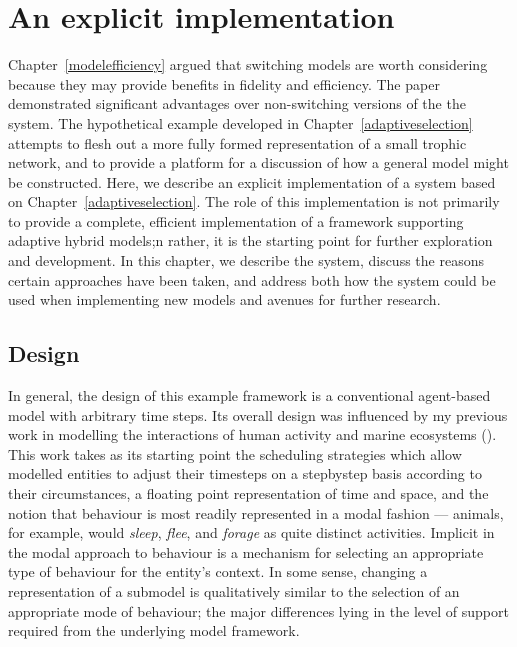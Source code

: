 

\chapter[AN EXPLICIT IMPLEMENTATION]{An explicit implementation}
\WeAreOn{\cfive}\label{explicitmodel}

Chapter~\ref{modelefficiency} argued that switching models are worth
considering because they may provide benefits in fidelity and
efficiency. The paper demonstrated significant advantages over
non-switching versions of the the system.  The hypothetical example
developed in Chapter~\ref{adaptiveselection} attempts to flesh out a
more fully formed representation of a small trophic network, and to
provide a platform for a discussion of how a general model might be
constructed. Here, we describe an explicit implementation of a system
based on Chapter~\ref{adaptiveselection}. The role of this
implementation is not primarily to provide a complete, efficient
implementation of a framework supporting adaptive hybrid models;n
rather, it is the starting point for further exploration and
development.  In this chapter, we describe the system, discuss the
reasons certain approaches have been taken, and address both how the
system could be used when implementing new models and avenues for
further research.

\section{Design}
In general, the design of this example framework is a conventional
agent-based model with arbitrary time steps. Its overall design was
influenced by my previous work in modelling the interactions of human
activity and marine ecosystems (\cite{lyne1994pmez5, gray06:1,
  gray2014}). This work takes as its starting point the scheduling
strategies which allow modelled entities to adjust their timesteps on
a step\-by\-step basis according to their circumstances, a floating
point representation of time and space, and the notion that behaviour
is most readily represented in a modal fashion --- animals, for
example, would \emph{sleep}\/, \emph{flee}\/, and \emph{forage}\/ as
quite distinct activities. Implicit in the modal approach to behaviour
is a mechanism for selecting an appropriate type of behaviour for the
entity's context. In some sense, changing a representation of a
submodel is qualitatively similar to the selection of an appropriate
mode of behaviour; the major differences lying in the level of
support required from the underlying model framework.

